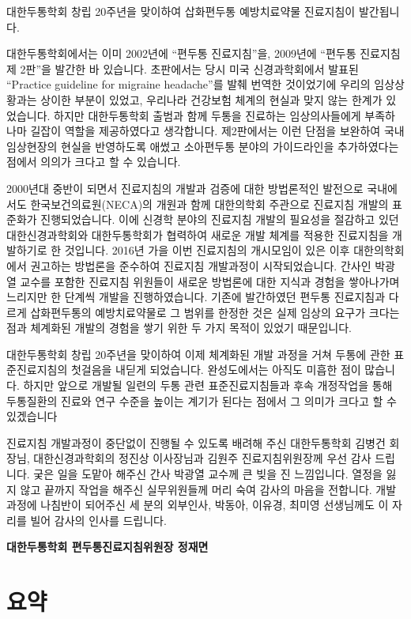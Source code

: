 \documentclass[]{book}
\begin{document}
대한두통학회 창립 20주년을 맞이하여 삽화편두통 예방치료약물 진료지침이 발간됩니다.

대한두통학회에서는 이미 2002년에 ``편두통 진료지침''을, 2009년에 ``편두통 진료지침 제 2판''을 발간한 바 있습니다. 초판에서는 당시 미국 신경과학회에서 발표된 ``Practice guideline for migraine headache''를 발췌 번역한 것이었기에 우리의 임상상황과는 상이한 부분이 있었고, 우리나라 건강보험 체계의 현실과 맞지 않는 한계가 있었습니다. 하지만 대한두통학회 출범과 함께 두통을 진료하는 임상의사들에게 부족하나마 길잡이 역할을 제공하였다고 생각합니다. 제2판에서는 이런 단점을 보완하여 국내 임상현장의 현실을 반영하도록 애썼고 소아편두통 분야의 가이드라인을 추가하였다는 점에서 의의가 크다고 할 수 있습니다.

2000년대 중반이 되면서 진료지침의 개발과 검증에 대한 방법론적인 발전으로 국내에서도 한국보건의료원(NECA)의 개원과 함께 대한의학회 주관으로 진료지침 개발의 표준화가 진행되었습니다. 이에 신경학 분야의 진료지침 개발의 필요성을 절감하고 있던 대한신경과학회와 대한두통학회가 협력하여 새로운 개발 체계를 적용한 진료지침을 개발하기로 한 것입니다. 2016년 가을 이번 진료지침의 개시모임이 있은 이후 대한의학회에서 권고하는 방법론을 준수하여 진료지침 개발과정이 시작되었습니다. 간사인 박광열 교수를 포함한 진료지침 위원들이 새로운 방법론에 대한 지식과 경험을 쌓아나가며 느리지만 한 단계씩 개발을 진행하였습니다. 기존에 발간하였던 편두통 진료지침과 다르게 삽화편두통의 예방치료약물로 그 범위를 한정한 것은 실제 임상의 요구가 크다는 점과 체계화된 개발의 경험을 쌓기 위한 두 가지 목적이 있었기 때문입니다.

대한두통학회 창립 20주년을 맞이하여 이제 체계화된 개발 과정을 거쳐 두통에 관한 표준진료지침의 첫걸음을 내딛게 되었습니다. 완성도에서는 아직도 미흡한 점이 많습니다. 하지만 앞으로 개발될 일련의 두통 관련 표준진료지침들과 후속 개정작업을 통해 두통질환의 진료와 연구 수준을 높이는 계기가 된다는 점에서 그 의미가 크다고 할 수 있겠습니다

진료지침 개발과정이 중단없이 진행될 수 있도록 배려해 주신 대한두통학회 김병건 회장님, 대한신경과학회의 정진상 이사장님과 김원주 진료지침위원장께 우선 감사 드립니다. 궂은 일을 도맡아 해주신 간사 박광열 교수께 큰 빚을 진 느낌입니다. 열정을 잃지 않고 끝까지 작업을 해주신 실무위원들께 머리 숙여 감사의 마음을 전합니다. 개발과정에 나침반이 되어주신 세 분의 외부인사, 박동아, 이유경, 최미영 선생님께도 이 자리를 빌어 감사의 인사를 드립니다.

\textbf{대한두통학회 편두통진료지침위원장 정재면}

\mainmatter

\hypertarget{section-2}{%
\chapter{요약}\label{section-2}}
\end{document}
